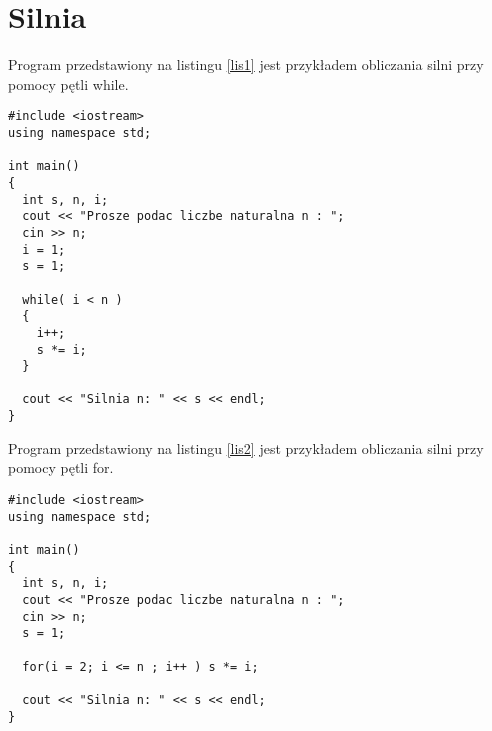 \documentclass[a4paper,11pt]{article}
\begin{document}

\section{Silnia}
Program przedstawiony na listingu \ref{lis1} jest przykładem obliczania silni przy pomocy pętli while.
\begin{lstlisting}[caption=Przykład obliczania silni przy pomocy pętli while, captionpos=b,
label=lis1, firstnumber=12,frame=single]
#include <iostream>
using namespace std;

int main()
{
  int s, n, i;
  cout << "Prosze podac liczbe naturalna n : ";
  cin >> n;
  i = 1;
  s = 1;
  
  while( i < n ) 
  {
  	i++;
  	s *= i;
  }
  
  cout << "Silnia n: " << s << endl;  	
}
\end{lstlisting}
Program przedstawiony na listingu \ref{lis2} jest przykładem obliczania silni przy pomocy pętli for. 
\begin{lstlisting}[caption=Przykład obliczania silni przy pomocy pętli for, captionpos=b,
label=lis2, firstnumber=12,frame=single]
#include <iostream>
using namespace std;

int main()
{
  int s, n, i;
  cout << "Prosze podac liczbe naturalna n : ";
  cin >> n;
  s = 1;
  
  for(i = 2; i <= n ; i++ ) s *= i;
  
  cout << "Silnia n: " << s << endl;  	
}
\end{lstlisting}
\end{document}
